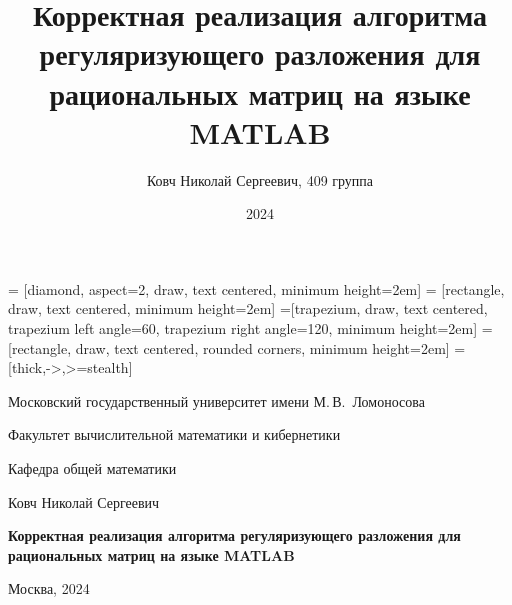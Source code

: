\documentclass[10pt,pdf,hyperref={unicode}]{beamer}
\institute{МГУ им. М.В.Ломоносова}
\title[]{Корректная реализация алгоритма регуляризующего разложения для рациональных матриц на языке MATLAB}
\author[Ковч Н.С.]{Ковч Николай Сергеевич, 409 группа}
\date{2024}
\begin{document}
 = [diamond, aspect=2, draw, text centered, minimum height=2em]
 = [rectangle, draw, text centered, minimum height=2em]
=[trapezium, draw, text centered, trapezium left angle=60, trapezium right angle=120, minimum height=2em]
 = [rectangle, draw, text centered, rounded corners, minimum height=2em]
 = [thick,->,>=stealth]
\begin{frame}
\begin{center}%
Московский государственный университет имени М.\,В.~Ломоносова
    
    Факультет вычислительной математики и кибернетики
    
    Кафедра общей математики
  \end{center}%
  \vfill%
  \begin{center}%
    \large%
    Ковч Николай Сергеевич
    
    \vspace{.5cm}
    
    \Large
    \textbf{Корректная реализация алгоритма регуляризующего разложения для рациональных матриц на языке MATLAB}
  \end{center}%
  \vfill
  \vfill%
  \vfill%
  \vfill%
  \vfill%
  \begin{center}%
    Москва, 2024%
  \end{center}%
\end{frame}
\end{document}
